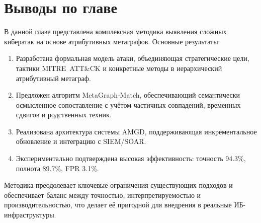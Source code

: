 \documentclass{article}
\begin{document}
\section{Выводы по главе}\label{sec:ch3/conclusion}

В данной главе представлена комплексная методика выявления сложных кибератак на основе атрибутивных метаграфов. Основные результаты:
\begin{enumerate}
    \item Разработана формальная модель атаки, объединяющая стратегические цели, тактики MITRE~ATT\&CK и конкретные методы в иерархический атрибутивный метаграф.
    \item Предложен алгоритм MetaGraph-Match, обеспечивающий семантически осмысленное сопоставление с учётом частичных совпадений, временных сдвигов и родственных техник.
    \item Реализована архитектура системы AMGD, поддерживающая инкрементальное обновление и интеграцию с SIEM/SOAR.
    \item Экспериментально подтверждена высокая эффективность: точность 94.3\%, полнота 89.7\%, FPR 3.1\%.
\end{enumerate}

Методика преодолевает ключевые ограничения существующих подходов и обеспечивает баланс между точностью, интерпретируемостью и производительностью, что делает её пригодной для внедрения в реальные ИБ-инфраструктуры.
\end{document}
